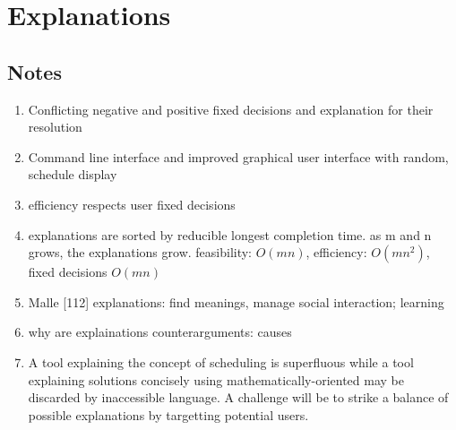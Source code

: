 \section{Explanations}



\subsection{Notes}
\begin{enumerate}
	\item Conflicting negative and positive fixed decisions and explanation for their resolution
	\item Command line interface and improved graphical user interface with random, schedule display
	\item efficiency respects user fixed decisions
	\item explanations are sorted by reducible longest completion time. as m and n grows, the explanations grow. feasibility: $O(mn)$, efficiency: $O(mn^2)$, fixed decisions $O(mn)$
	\item Malle [112] explanations: find meanings, manage social interaction; learning
	\item why are explainations counterarguments: causes
	\item A tool explaining the concept of scheduling is superfluous while a tool explaining solutions concisely using mathematically-oriented may be discarded by inaccessible language. A challenge will be to strike a balance of possible explanations by targetting potential users.
\end{enumerate}

